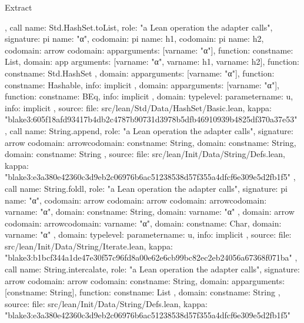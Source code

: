 \begin{lexlean}{Extract}
\begin{toolingmodule}
{{{      }
    },
    call{
      name: Std.HashSet.toList,
      role: "a Lean operation the adapter calls",
      signature: pi{
        name: "α",
        codomain: pi{
          name: h1,
          codomain: pi{
            name: h2,
            codomain: arrow{
              codomain: app{arguments: [var{name: "α"}], function: const{name: List}},
              domain: app{
                arguments: [var{name: "α"}, var{name: h1}, var{name: h2}],
                function: const{name: Std.HashSet}
              }
            },
            domain: app{arguments: [var{name: "α"}], function: const{name: Hashable}},
            info: implicit
          },
          domain: app{arguments: [var{name: "α"}], function: const{name: BEq}},
          info: implicit
        },
        domain: type{level: parameter{name: u}},
        info: implicit
      },
      source: {
        file: src/lean/Std/Data/HashSet/Basic.lean,
        kappa: "blake3:605f18afd93417b4db2c4787b90731d3978b5dfb46910939b4825df370a37e53"
      }
    },
    call{
      name: String.append,
      role: "a Lean operation the adapter calls",
      signature: arrow{
        codomain: arrow{codomain: const{name: String}, domain: const{name: String}},
        domain: const{name: String}
      },
      source: {
        file: src/lean/Init/Data/String/Defs.lean,
        kappa: "blake3:e3a380e42360c3d9eb2c06976b6ac51238538d57f355a4dfcf6e309e5d2fb1f5"
      }
    },
    call{
      name: String.foldl,
      role: "a Lean operation the adapter calls",
      signature: pi{
        name: "α",
        codomain: arrow{
          codomain: arrow{
            codomain: arrow{codomain: var{name: "α"}, domain: const{name: String}},
            domain: var{name: "α"}
          },
          domain: arrow{
            codomain: arrow{codomain: var{name: "α"}, domain: const{name: Char}},
            domain: var{name: "α"}
          }
        },
        domain: type{level: parameter{name: u}},
        info: implicit
      },
      source: {
        file: src/lean/Init/Data/String/Iterate.lean,
        kappa: "blake3:b1bcf344a1de47e30f57c96fd8a00e62e6cb99bc82ec2eb24056a67368f071ba"
      }
    },
    call{
      name: String.intercalate,
      role: "a Lean operation the adapter calls",
      signature: arrow{
        codomain: arrow{
          codomain: const{name: String},
          domain: app{arguments: [const{name: String}], function: const{name: List}}
        },
        domain: const{name: String}
      },
      source: {
        file: src/lean/Init/Data/String/Defs.lean,
        kappa: "blake3:e3a380e42360c3d9eb2c06976b6ac51238538d57f355a4dfcf6e309e5d2fb1f5"
}}}
\end{toolingmodule}
\end{lexlean}
